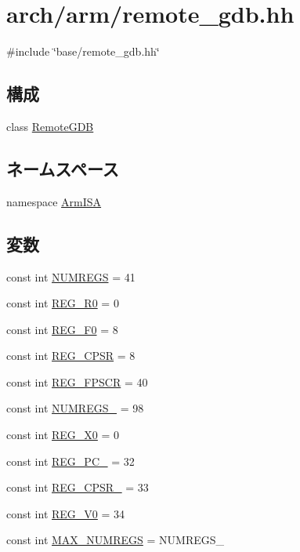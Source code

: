 \hypertarget{arch_2arm_2remote__gdb_8hh}{
\section{arch/arm/remote\_\-gdb.hh}
\label{arch_2arm_2remote__gdb_8hh}
}
{\ttfamily \#include \char`\"{}base/remote\_\-gdb.hh\char`\"{}}\par
\subsection*{構成}
\begin{DoxyCompactItemize}
\item 
class \hyperlink{classArmISA_1_1RemoteGDB}{RemoteGDB}
\end{DoxyCompactItemize}
\subsection*{ネームスペース}
\begin{DoxyCompactItemize}
\item 
namespace \hyperlink{namespaceArmISA}{ArmISA}
\end{DoxyCompactItemize}
\subsection*{変数}
\begin{DoxyCompactItemize}
\item 
const int \hyperlink{namespaceArmISA_a5e01759c5e46a6dc01fe49ab50bb6e00}{NUMREGS} = 41
\item 
const int \hyperlink{namespaceArmISA_a4fa57671641043c4b62f70b9bce8ccb8}{REG\_\-R0} = 0
\item 
const int \hyperlink{namespaceArmISA_acae4695b1cfeb92733853c4004e5cc0d}{REG\_\-F0} = 8
\item 
const int \hyperlink{namespaceArmISA_a6249871e6a49277c50fb18f1fc2483d0}{REG\_\-CPSR} = 8
\item 
const int \hyperlink{namespaceArmISA_aa9b26dfc9b670d532c14214da66fcaae}{REG\_\-FPSCR} = 40
\item 
const int \hyperlink{namespaceArmISA_ad32b37b55b8c8a8fdcdcd87423e17189}{NUMREGS\_} = 98
\item 
const int \hyperlink{namespaceArmISA_a2283a0bd82593b7723272883eadf364e}{REG\_\-X0} = 0
\item 
const int \hyperlink{namespaceArmISA_a20d3b99c48864ea883ee0651b9659e95}{REG\_\-PC\_} = 32
\item 
const int \hyperlink{namespaceArmISA_a3e645dbddff836ee0d600223d6532d55}{REG\_\-CPSR\_} = 33
\item 
const int \hyperlink{namespaceArmISA_a1b5af5a2bc57711018eab7bd48c3306a}{REG\_\-V0} = 34
\item 
const int \hyperlink{namespaceArmISA_a5041ef5f8524890da7f1670c2ff06d16}{MAX\_\-NUMREGS} = NUMREGS\_
\end{DoxyCompactItemize}
